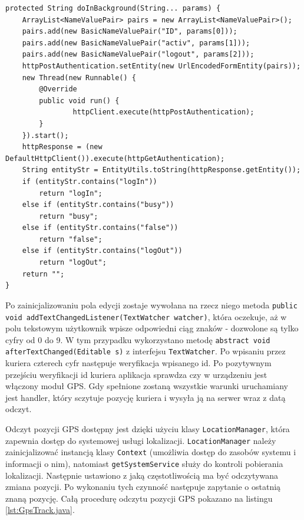 \documentclass[eng,printmode,oneside]{mgr}
\begin{document}
\begin{lstlisting}[caption=klasa
AuthenticationDeliverer metoda
doInBackground,label=lst:AuthentictionDeliverer.java]
protected String doInBackground(String... params) {
	ArrayList<NameValuePair> pairs = new ArrayList<NameValuePair>();
	pairs.add(new BasicNameValuePair("ID", params[0]));
	pairs.add(new BasicNameValuePair("activ", params[1]));
	pairs.add(new BasicNameValuePair("logout", params[2]));
	httpPostAuthentication.setEntity(new UrlEncodedFormEntity(pairs));
	new Thread(new Runnable() {
		@Override
		public void run() {
				httpClient.execute(httpPostAuthentication);
		}
	}).start();
	httpResponse = (new DefaultHttpClient()).execute(httpGetAuthentication);
	String entityStr = EntityUtils.toString(httpResponse.getEntity());
	if (entityStr.contains("logIn"))
		return "logIn";
	else if (entityStr.contains("busy"))
		return "busy";
	else if (entityStr.contains("false"))
		return "false";
	else if (entityStr.contains("logOut"))
		return "logOut";
	return "";
}
\end{lstlisting}

Po zainicjalizowaniu pola edycji zostaje wywołana na rzecz niego metoda
\texttt{public void addTextChangedListener(TextWatcher watcher)}, która
oczekuje, aż w polu tekstowym użytkownik wpisze odpowiedni ciąg znaków -
dozwolone są tylko cyfry od 0 do 9. W tym przypadku wykorzystano metodę
\texttt{abstract void afterTextChanged(Editable s)} z interfejsu
\texttt{TextWatcher}. Po wpisaniu przez kuriera czterech cyfr następuje weryfikacja wpisanego id. Po pozytywnym
przejściu weryfikacji id kuriera aplikacja sprawdza czy w urządzeniu jest
włączony moduł GPS. Gdy spełnione zostaną wszystkie warunki uruchamiany jest
handler, który sczytuje pozycję kuriera i wysyła ją na serwer wraz z datą odczyt. 

Odczyt pozycji GPS dostępny jest dzięki użyciu klasy \texttt{LocationManager},
która zapewnia dostęp do systemowej usługi lokalizacji. \texttt{LocationManager}
należy zainicjalizować instancją klasy \texttt{Context} (umożliwia dostęp do
zasobów systemu i informacji o nim), natomiast \texttt{getSystemService} służy
do kontroli pobierania lokalizacji. Następnie ustawiono z jaką częstotliwością
ma być odczytywana zmiana pozycji. Po wykonaniu tych czynność następuje
zapytanie o ostatnią znaną pozycję. Całą procedurę odczytu pozycji GPS pokazano
na listingu \ref{lst:GpsTrack.java}.
\end{document}
